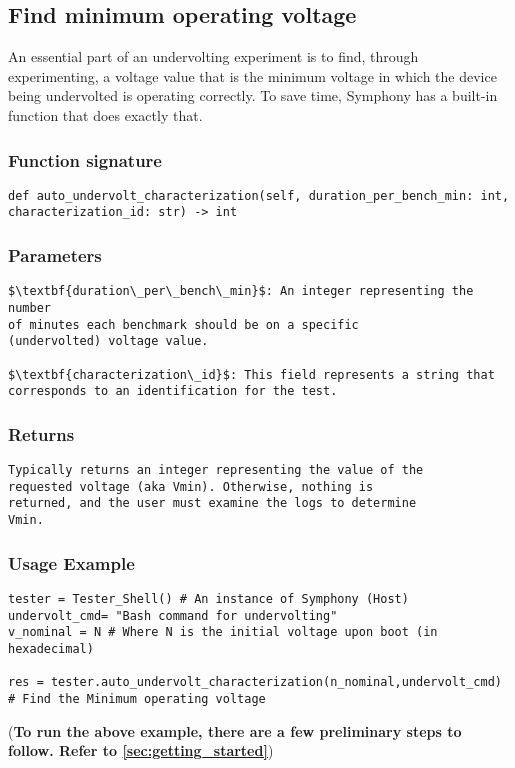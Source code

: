 \subsection{Find minimum operating voltage}
An essential part of an undervolting experiment is to find, through experimenting, a voltage value that is the minimum voltage in which the device being undervolted is operating correctly. To save time, Symphony has a built-in function that does exactly that.

\subsubsection{Function signature}

\begin{lstlisting}
def auto_undervolt_characterization(self, duration_per_bench_min: int, characterization_id: str) -> int
\end{lstlisting}

\subsubsection{Parameters}
\begin{lstlisting}[mathescape=true]
$\textbf{duration\_per\_bench\_min}$: An integer representing the number 
of minutes each benchmark should be on a specific 
(undervolted) voltage value.

$\textbf{characterization\_id}$: This field represents a string that 
corresponds to an identification for the test.

\end{lstlisting}

\subsubsection{Returns}
\begin{lstlisting}[mathescape=true]
Typically returns an integer representing the value of the 
requested voltage (aka Vmin). Otherwise, nothing is 
returned, and the user must examine the logs to determine 
Vmin.
\end{lstlisting}

\subsubsection{Usage Example}
\begin{lstlisting}
tester = Tester_Shell() # An instance of Symphony (Host)
undervolt_cmd= "Bash command for undervolting"
v_nominal = N # Where N is the initial voltage upon boot (in hexadecimal)

res = tester.auto_undervolt_characterization(n_nominal,undervolt_cmd)  # Find the Minimum operating voltage
\end{lstlisting}
(\textbf{To run the above example, there are a few preliminary steps to follow. Refer to \autoref{sec:getting_started}})